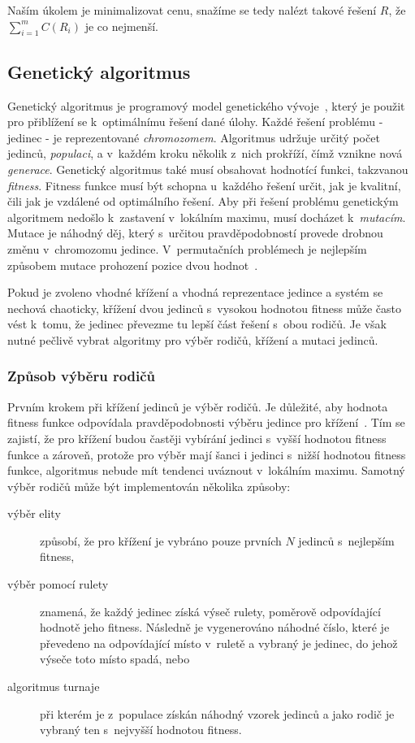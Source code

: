 \documentclass[a4paper]{article}
\begin{document}
Naším úkolem je minimalizovat cenu, snažíme se tedy nalézt takové řešení $R$, že $\sum\limits_{i=1}^m C(R_i)$ je co nejmenší.

\subsection{Genetický algoritmus}
Genetický algoritmus je programový model genetického vývoje~\cite{sfc}, který je použit pro přiblížení se k~optimálnímu řešení dané úlohy. Každé řešení problému - jedinec - je reprezentované \emph{chromozomem}. Algoritmus udržuje určitý počet jedinců, \emph{populaci}, a v~každém kroku několik z~nich prokříží, čímž vznikne nová \emph{generace}. Genetický algoritmus také musí obsahovat hodnotící funkci, takzvanou \emph{fitness}. Fitness funkce musí být schopna u~každého řešení určit, jak je kvalitní, čili jak je vzdálené od optimálního řešení. Aby při řešení problému genetickým algoritmem nedošlo k~zastavení v~lokálním maximu, musí docházet k~\emph{mutacím}. Mutace je náhodný děj, který s~určitou pravděpodobností provede drobnou změnu v~chromozomu jedince. V~permutačních problémech je nejlepším způsobem mutace prohození pozice dvou hodnot~\cite{adal}.

Pokud je zvoleno vhodné křížení a vhodná reprezentace jedince a systém se nechová chaoticky, křížení dvou jedinců s~vysokou hodnotou fitness může často vést k~tomu, že jedinec převezme tu lepší část řešení s~obou rodičů. Je však nutné pečlivě vybrat algoritmy pro výběr rodičů, křížení a mutaci jedinců.

\subsubsection{Způsob výběru rodičů}
Prvním krokem při křížení jedinců je výběr rodičů. Je důležité, aby hodnota fitness funkce odpovídala pravděpodobnosti výběru jedince pro křížení~\cite{sfc}. Tím se zajistí, že pro křížení budou častěji vybírání jedinci s~vyšší hodnotou fitness funkce a zároveň, protože pro výběr mají šanci i jedinci s~nižší hodnotou fitness funkce, algoritmus nebude mít tendenci uváznout v~lokálním maximu. Samotný výběr rodičů může být implementován několika způsoby:

\begin{description}
\item[výběr elity] způsobí, že pro křížení je vybráno pouze prvních $N$ jedinců s~nejlepším fitness,
\item[výběr pomocí rulety] znamená, že každý jedinec získá výseč rulety, poměrově odpovídající hodnotě jeho fitness. Následně je vygenerováno náhodné číslo, které je převedeno na odpovídající místo v~ruletě a vybraný je jedinec, do jehož výseče toto místo spadá, nebo
\item[algoritmus turnaje] při kterém je z~populace získán náhodný vzorek jedinců a jako rodič je vybraný ten s~nejvyšší hodnotou fitness.
\end{description}
\end{document}
